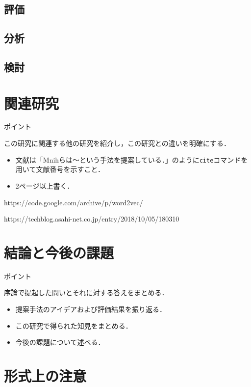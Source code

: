 \documentclass[a4j,11pt,report]{jsbook}
\newcommand{\point}[1]{
\begin{itembox}[l]{ポイント}
  #1
\end{itembox}
}
\begin{document}
\section{評価}
\section{分析}
\section{検討}





\chapter{関連研究\label{ch:relatedwork}}
\point{
この研究に関連する他の研究を紹介し，この研究との違いを明確にする．
\begin{itemize}
  \item 文献は「Mnihらは～という手法を提案している\cite{Mnih15}．」のように\texttt{cite}コマンドを用いて文献番号を示すこと．
  \item 2ページ以上書く．
\end{itemize}

https://code.google.com/archive/p/word2vec/

https://techblog.asahi-net.co.jp/entry/2018/10/05/180310
}

\chapter{結論と今後の課題 \label{ch:conclusion}}

\point{
序論で提起した問いとそれに対する答えをまとめる．
\begin{itemize}
  \item 提案手法のアイデアおよび評価結果を振り返る．
  \item この研究で得られた知見をまとめる．
  \item 今後の課題について述べる．
\end{itemize}
}




\appendix

\chapter{形式上の注意}
\end{document}
